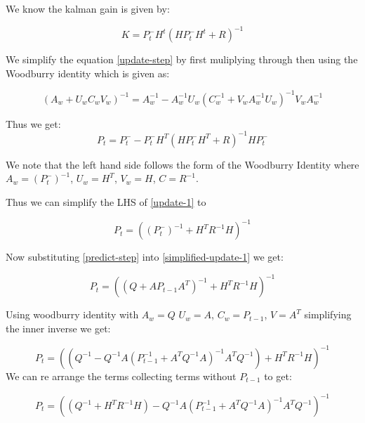 \documentclass{tufte-handout}
\begin{document}
\begin{enumerate}[(a)]
   We know the kalman gain is given by: 
   
   \begin{equation}
       K = P_t^{-}H^{t}(HP^{-}_t H^t + R)^{-1}
   \end{equation}
   
   We simplify the equation \ref{update-step} by first muliplying through then using the Woodburry identity \cite{ enwiki:1158363831} which is given as:
   
   \begin{equation*}
    (A_w + U_wC_wV_w)^{-1} = A_w^{-1} - A_w^{-1}U_w(C_w^{-1} + V_wA_w^{-1}U_w)^{-1} V_wA_w^{-1}
   \end{equation*}

   Thus we get:
   \begin{equation}
        P_t = P_t^{-} -  P_t^{-}H^T(H P^{-}_{t}H^T + R)^{-1}H P_t^{-}
        \label{update-1}
   \end{equation}
   
   We note that the left hand side follows the form of the Woodburry Identity\cite{enwiki:1158363831} where $A_w = (P_t^{-})^{-1}$, $U_w = H^T$, $V_w = H$, $C = R^{-1}$.
   
   Thus we can simplify the LHS of \ref{update-1} to 

   \begin{equation}
       P_t = ((P_t^{-})^{-1} +   H^TR^{-1}H)^{-1}
       \label{simplified-update-1}
   \end{equation}

    Now substituting \ref{predict-step}  into \ref{simplified-update-1} we get:
    
    \begin{equation}
       P_t = ((Q + AP_{t-1}A^T)^{-1} + H^TR^{-1}H)^{-1}
    \end{equation}

    Using woodburry identity with $A_w = Q$ $U_w = A$, $C_w = P_{t-1}$, $V = A^T$ simplifying the inner inverse we get:
    
    \begin{equation}
       P_t = \left( (Q^{-1} - Q^{-1}A(P_{t-1}^{-1} + A^TQ^{-1}A)^{-1}A^{T}Q^{-1})+ H^TR^{-1}H \right)^{-1}
    \end{equation}
We can re arrange the terms collecting terms without $P_{t-1}$  to get: 

    \begin{equation}
       P_t = \left( (Q^{-1}  + H^TR^{-1}H)   - Q^{-1}A(P_{t-1}^{-1} + A^TQ^{-1}A)^{-1}A^{T}Q^{-1} \right)^{-1}
    \end{equation}


\end{enumerate}
\end{document}

